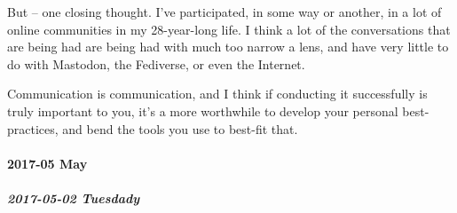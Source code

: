 \documentclass[11pt]{article}
\begin{document}
\begin{itemize}
\begin{itemize}
But – one closing thought. I’ve participated, in some way or another, in a lot of online communities in my 28-year-long life. I think a lot of the conversations that are being had are being had with much too narrow a lens, and have very little to do with Mastodon, the Fediverse, or even the Internet.

Communication is communication, and I think if conducting it successfully is truly important to you, it’s a more worthwhile to develop your personal best-practices, and bend the tools you use to best-fit that.
\end{itemize}
\end{itemize}
\stopcontents[level-4]
\paragraph*{2017-05 May}
\label{sec:orgaefa62f}
\startcontents[level-4]
\subparagraph*{2017-05-02 Tuesdady}
\label{sec:org3762c69}
\end{document}
